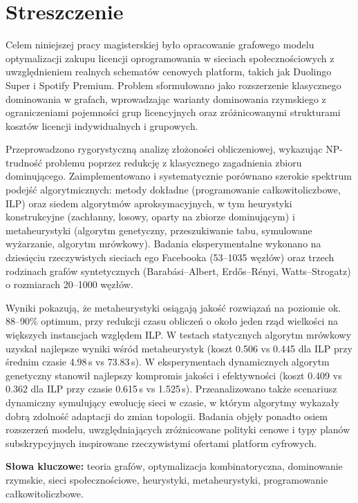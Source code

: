 \section*{Streszczenie}

Celem niniejszej pracy magisterskiej było opracowanie grafowego modelu optymalizacji zakupu licencji oprogramowania w sieciach społecznościowych z uwzględnieniem realnych schematów cenowych platform, takich jak Duolingo Super i Spotify Premium. Problem sformułowano jako rozszerzenie klasycznego dominowania w grafach, wprowadzając warianty dominowania rzymskiego z ograniczeniami pojemności grup licencyjnych oraz zróżnicowanymi strukturami kosztów licencji indywidualnych i grupowych.

Przeprowadzono rygorystyczną analizę złożoności obliczeniowej, wykazując NP-trudność problemu poprzez redukcję z klasycznego zagadnienia zbioru dominującego. Zaimplementowano i systematycznie porównano szerokie spektrum podejść algorytmicznych: metody dokładne (programowanie całkowitoliczbowe, ILP) oraz siedem algorytmów aproksymacyjnych, w tym heurystyki konstrukcyjne (zachłanny, losowy, oparty na zbiorze dominującym) i metaheurystyki (algorytm genetyczny, przeszukiwanie tabu, symulowane wyżarzanie, algorytm mrówkowy). Badania eksperymentalne wykonano na dziesięciu rzeczywistych sieciach ego Facebooka (53--1035 węzłów) oraz trzech rodzinach grafów syntetycznych (Barabási--Albert, Erdős--Rényi, Watts--Strogatz) o rozmiarach 20--1000 węzłów.

Wyniki pokazują, że metaheurystyki osiągają jakość rozwiązań na poziomie ok. 88--90\% optimum, przy redukcji czasu obliczeń o około jeden rząd wielkości na większych instancjach względem ILP. W testach statycznych algorytm mrówkowy uzyskał najlepsze wyniki wśród metaheurystyk (koszt 0.506 vs 0.445 dla ILP przy średnim czasie 4.98\,s vs 73.83\,s). W eksperymentach dynamicznych algorytm genetyczny stanowił najlepszy kompromis jakości i efektywności (koszt 0.409 vs 0.362 dla ILP przy czasie 0.615\,s vs 1.525\,s). Przeanalizowano także scenariusz dynamiczny symulujący ewolucję sieci w czasie, w którym algorytmy wykazały dobrą zdolność adaptacji do zmian topologii. Badania objęły ponadto osiem rozszerzeń modelu, uwzględniających zróżnicowane polityki cenowe i typy planów subskrypcyjnych inspirowane rzeczywistymi ofertami platform cyfrowych.

\textbf{Słowa kluczowe:} teoria grafów, optymalizacja kombinatoryczna, dominowanie rzymskie, sieci społecznościowe, heurystyki, metaheurystyki, programowanie całkowitoliczbowe.
